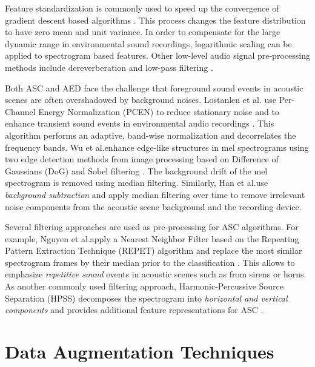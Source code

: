 \documentclass[applsci,article,submit,oneauthor,pdftex]{Definitions/mdpi}
\makeatletter
\newcommand{\etal}{{et al}.\@ }
\makeatother
\begin{document}
Feature standardization is commonly used to speed up the convergence of gradient descent based algorithms \citep{Mars:2019:BinauralASC:DCASE}. This process changes the feature distribution to have zero mean and unit variance. 
In order to compensate for the large dynamic range in environmental sound recordings, logarithmic  scaling can be applied to spectrogram based features.
Other low-level audio signal pre-processing methods include dereverberation and low-pass filtering \citep{Seo:2019:ASC:DCASE}.

Both ASC and AED face the challenge that foreground sound events in acoustic scenes are often overshadowed by background noises.
Lostanlen et al. use Per-Channel Energy Normalization (PCEN) \citep{Wang:2017:PCEN:ICASSP} to reduce stationary noise and to enhance transient sound events in environmental audio recordings \citep{Lostanlen:2018:PCEN:SPL}.
This algorithm performs an adaptive, band-wise normalization and decorrelates the frequency bands.
Wu \etal enhance edge-like structures in mel spectrograms using two edge detection methods from image processing based on Difference of Gaussians (DoG) and Sobel filtering \citep{Wu:2019:SoundTexture:ICASSP}. 
The background drift of the mel spectrogram is removed using median filtering.
Similarly, Han \etal use \textit{background subtraction} and apply median filtering over time \citep{Han:2017:BinauralASC:DCASE} to remove irrelevant noise components from the acoustic scene background and the recording device.

Several filtering approaches are used as pre-processing for ASC algorithms.
For example, Nguyen \etal apply a Nearest Neighbor Filter based on the Repeating Pattern Extraction Technique (REPET) algorithm \citep{Rafii:2012:REPET:ISMIR} and replace the most similar spectrogram frames by their median prior to the classification \citep{Nguyen:2018:ASCEnsemble:DCASE}.
This allows to emphasize \textit{repetitive sound} events in acoustic scenes such as from sirens or horns.
As another commonly used filtering approach, 
Harmonic-Percussive Source Separation (HPSS) decomposes the spectrogram into \textit{horizontal and vertical components} and provides additional feature representations for ASC \citep{Han:2017:BinauralASC:DCASE, Mariotti:2018:DeepVisionASC:DCASE, Seo:2019:ASC:DCASE}.

\section{Data Augmentation Techniques}
\label{sec:data_augmentation}
\end{document}
